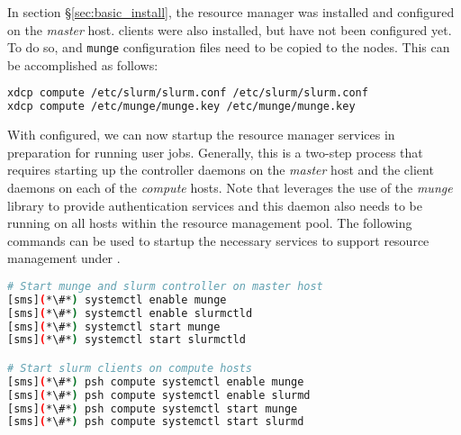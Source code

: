 In section \S\ref{sec:basic_install}, the \SLURM{} resource manager was
installed and configured on the  {\em master} host. \SLURM{} clients were also
installed, but have not been configured yet. To do so, \SLURM{} and
\texttt{munge} configuration files need to be copied to the nodes. This can be
accomplished as follows:

\begin{lstlisting}[language=bash,keywords={}]
xdcp compute /etc/slurm/slurm.conf /etc/slurm/slurm.conf
xdcp compute /etc/munge/munge.key /etc/munge/munge.key
\end{lstlisting}



With \SLURM{} configured, we can now startup the
resource manager services in preparation for running user jobs. Generally, this
is a two-step process that requires starting up the controller daemons on the {\em
 master} host and the client daemons on each of the {\em compute} hosts.
Note that \SLURM{} leverages the use of the {\em munge} library to provide
authentication services and this daemon also needs to be running on all hosts
within the resource management pool. 
The following commands can be used to startup the necessary services to support
resource management under \SLURM{}.





\begin{lstlisting}[language=bash,keywords={}]
# Start munge and slurm controller on master host
[sms](*\#*) systemctl enable munge
[sms](*\#*) systemctl enable slurmctld
[sms](*\#*) systemctl start munge
[sms](*\#*) systemctl start slurmctld

# Start slurm clients on compute hosts
[sms](*\#*) psh compute systemctl enable munge
[sms](*\#*) psh compute systemctl enable slurmd
[sms](*\#*) psh compute systemctl start munge
[sms](*\#*) psh compute systemctl start slurmd
\end{lstlisting}

